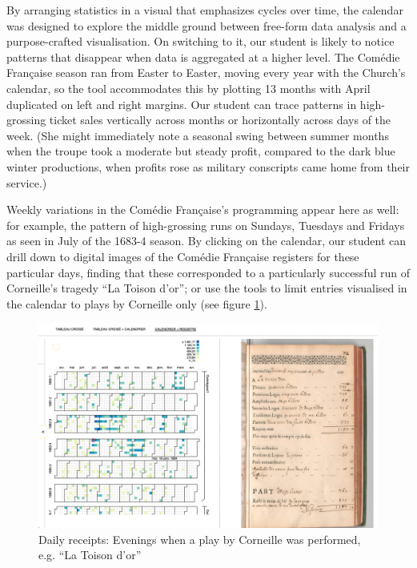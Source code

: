 \documentclass[	DIV=calc,%
							paper=a4,%
							fontsize=11pt,%
							twocolumn]{scrartcl}	 					%
\begin{document}
By arranging statistics in a visual that emphasizes cycles over time, the calendar was designed to explore the middle ground between free-form data analysis and a purpose-crafted visualisation.  On switching to it, our student is likely to notice patterns that disappear when data is aggregated at a higher level.  The Comédie Française season ran from Easter to Easter, moving every year with the Church's calendar, so the tool accommodates this by plotting 13 months with April duplicated on left and right margins.  Our student can trace patterns in high-grossing ticket sales vertically across months or horizontally across days of the week.  (She might immediately note a seasonal swing between summer months when the troupe took a moderate but steady profit, compared to the dark blue winter productions, when profits rose as military conscripts came home from their service.)

Weekly variations in the Comédie Française's programming appear here as well: for example, the pattern of high-grossing runs on Sundays, Tuesdays and Fridays as seen in July of the 1683-4 season.  By clicking on the calendar, our student can drill down to digital images of the Comédie Française registers for these particular days, finding that these corresponded to a particularly successful run of Corneille's tragedy ``La Toison d'or''; or use the tools to limit entries visualised in the calendar to plays by Corneille only (see figure \ref{fig:register-image-corneille}).

\begin{figure}
  \centering
	\includegraphics[width=7in]{steps/register-image-corneille.png}
	\caption{Daily receipts: Evenings when a play by Corneille was performed, e.g. ``La Toison d'or''}
	\label{fig:register-image-corneille}
\end{figure}
\end{document}

